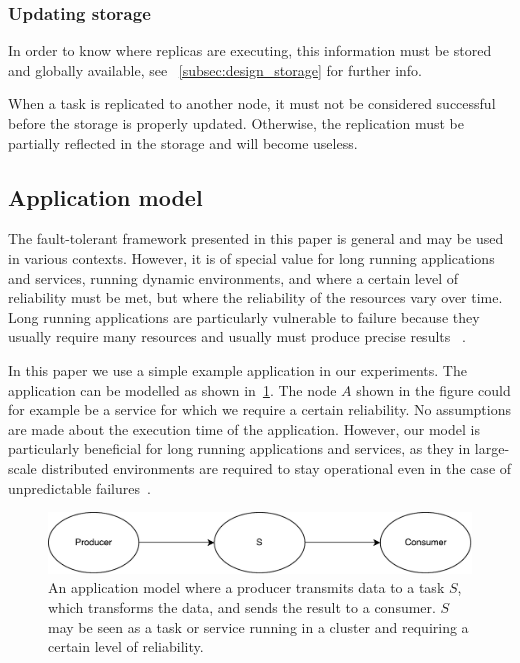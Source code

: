 \documentclass{cslthse-msc}
\begin{document}
\subsubsection{Updating storage}
In order to know where replicas are executing, this information must be stored and globally available, see ~\cref{subsec:design_storage} for further info. 

When a task is replicated to another node, it must not be considered successful before the storage is properly updated. Otherwise, the replication must be partially reflected in the storage and will become useless. %

\subsection{Application model} \label{subsec:design_app_model}
The fault-tolerant framework presented in this paper is general and may be used in various contexts. However, it is of special value for long running applications and services, running dynamic environments, and where a certain level of reliability must be met, but where the reliability of the resources vary over time. Long running applications are particularly vulnerable to failure because they usually require many resources and usually must produce precise results ~\cite{relGridSystems}.

In this paper we use a simple example application in our experiments. The application can be modelled as shown in~\cref{fig:app_model}. The node $A$ shown in the figure could for example be a service for which we require a certain reliability. No assumptions are made about the execution time of the application. However, our model is particularly beneficial for long running applications and services, as they in large-scale distributed environments are required to stay operational even in the case of unpredictable failures~\cite{imprRelAdaptRL}.


\begin{figure}[!hbt]
\centering
\includegraphics[scale=0.5]{images/app_model.pdf} 
\caption{An application model where a producer transmits data to a task $S$, which transforms the data, and sends the result to a consumer. $S$ may be seen as a task or service running in a cluster and requiring a certain level of reliability.}\label{fig:app_model}
\end{figure}
\end{document}
